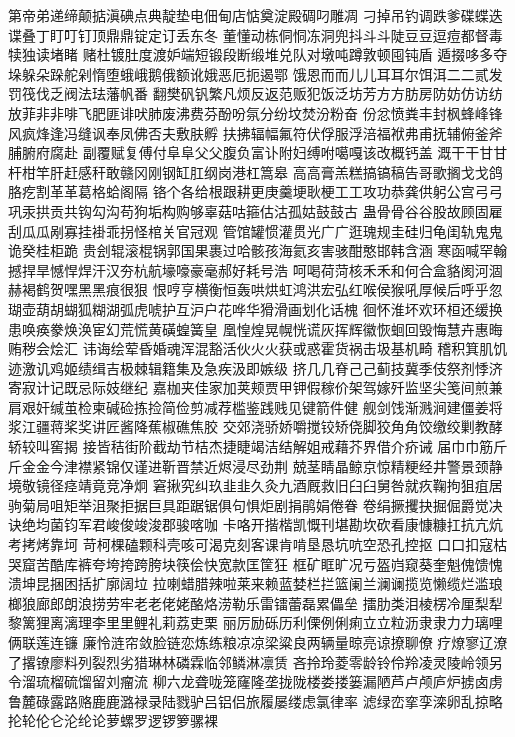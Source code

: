 第帝弟递缔颠掂滇碘点典靛垫电佃甸店惦奠淀殿碉叼雕凋
刁掉吊钓调跌爹碟蝶迭谍叠丁盯叮钉顶⿍鼎锭定订丢东冬
董懂动栋侗恫冻洞兜抖⽃斗陡⾖豆逗痘都督毒犊独读堵睹
赌杜镀肚度渡妒端短锻段断缎堆兑队对墩吨蹲敦顿囤钝盾
遁掇哆多夺垛躲朵跺舵剁惰堕蛾峨鹅俄额讹娥恶厄扼遏鄂
饿恩⽽而⼉儿⽿耳尔饵洱⼆二贰发罚筏伐乏阀法珐藩帆番
翻樊矾钒繁凡烦反返范贩犯饭泛坊芳⽅方肪房防妨仿访纺
放菲⾮非啡飞肥匪诽吠肺废沸费芬酚吩氛分纷坟焚汾粉奋
份忿愤粪丰封枫蜂峰锋风疯烽逢冯缝讽奉凤佛否夫敷肤孵
扶拂辐幅氟符伏俘服浮涪福袱弗甫抚辅俯釜斧脯腑府腐赴
副覆赋复傅付⾩阜⽗父腹负富讣附妇缚咐噶嘎该改概钙盖
溉⼲干⽢甘杆柑竿肝赶感秆敢赣冈刚钢缸肛纲岗港杠篙皋
⾼高膏羔糕搞镐稿告哥歌搁⼽戈鸽胳疙割⾰革葛格蛤阁隔
铬个各给根跟耕更庚羹埂耿梗⼯工攻功恭龚供躬公宫⼸弓
巩汞拱贡共钩勾沟苟狗垢构购够辜菇咕箍估沽孤姑⿎鼓古
蛊⾻骨⾕谷股故顾固雇刮⽠瓜剐寡挂褂乖拐怪棺关官冠观
管馆罐惯灌贯光⼴广逛瑰规圭硅归龟闺轨⿁鬼诡癸桂柜跪
贵刽辊滚棍锅郭国果裹过哈骸孩海氦亥害骇酣憨邯韩含涵
寒函喊罕翰撼捍旱憾悍焊汗汉夯杭航壕嚎豪毫郝好耗号浩
呵喝荷菏核⽲禾和何合盒貉阂河涸赫褐鹤贺嘿⿊黑痕很狠
恨哼亨横衡恒轰哄烘虹鸿洪宏弘红喉侯猴吼厚候后呼乎忽
瑚壶葫胡蝴狐糊湖弧虎唬护互沪户花哗华猾滑画划化话槐
徊怀淮坏欢环桓还缓换患唤痪豢焕涣宦幻荒慌黄磺蝗簧皇
凰惶煌晃幌恍谎灰挥辉徽恢蛔回毁悔慧卉惠晦贿秽会烩汇
讳诲绘荤昏婚魂浑混豁活伙⽕火获或惑霍货祸击圾基机畸
稽积箕肌饥迹激讥鸡姬绩缉吉极棘辑籍集及急疾汲即嫉级
挤⼏几脊⼰己蓟技冀季伎祭剂悸济寄寂计记既忌际妓继纪
嘉枷夹佳家加荚颊贾甲钾假稼价架驾嫁歼监坚尖笺间煎兼
肩艰奸缄茧检柬碱硷拣捡简俭剪减荐槛鉴践贱见键箭件健
舰剑饯渐溅涧建僵姜将浆江疆蒋桨奖讲匠酱降蕉椒礁焦胶
交郊浇骄娇嚼搅铰矫侥脚狡⾓角饺缴绞剿教酵轿较叫窖揭
接皆秸街阶截劫节桔杰捷睫竭洁结解姐戒藉芥界借介疥诫
届⼱巾筋⽄斤⾦金今津襟紧锦仅谨进靳晋禁近烬浸尽劲荆
兢茎睛晶鲸京惊精粳经井警景颈静境敬镜径痉靖竟竞净炯
窘揪究纠玖⾲韭久灸九酒厩救旧⾅臼舅咎就疚鞠拘狙疽居
驹菊局咀矩举沮聚拒据巨具距踞锯俱句惧炬剧捐鹃娟倦眷
卷绢撅攫抉掘倔爵觉决诀绝均菌钧军君峻俊竣浚郡骏喀咖
卡咯开揩楷凯慨刊堪勘坎砍看康慷糠扛抗亢炕考拷烤靠坷
苛柯棵磕颗科壳咳可渴克刻客课肯啃垦恳坑吭空恐孔控抠
⼝口扣寇枯哭窟苦酷库裤夸垮挎跨胯块筷侩快宽款匡筐狂
框矿眶旷况亏盔岿窥葵奎魁傀馈愧溃坤昆捆困括扩廓阔垃
拉喇蜡腊辣啦莱来赖蓝婪栏拦篮阑兰澜谰揽览懒缆烂滥琅
榔狼廊郎朗浪捞劳牢⽼老佬姥酪烙涝勒乐雷镭蕾磊累儡垒
擂肋类泪棱楞冷厘梨犁黎篱狸离漓理李⾥里鲤礼莉荔吏栗
丽厉励砾历利傈例俐痢⽴立粒沥⾪隶⼒力璃哩俩联莲连镰
廉怜涟帘敛脸链恋炼练粮凉凉梁粱良两辆量晾亮谅撩聊僚
疗燎寥辽潦了撂镣廖料列裂烈劣猎琳林磷霖临邻鳞淋凛赁
吝拎玲菱零龄铃伶羚凌灵陵岭领另令溜琉榴硫馏留刘瘤流
柳六龙聋咙笼窿隆垄拢陇楼娄搂篓漏陋芦卢颅庐炉掳卤虏
鲁麓碌露路赂⿅鹿潞禄录陆戮驴吕铝侣旅履屡缕虑氯律率
滤绿峦挛孪滦卵乱掠略抡轮伦仑沦纶论萝螺罗逻锣箩骡裸
